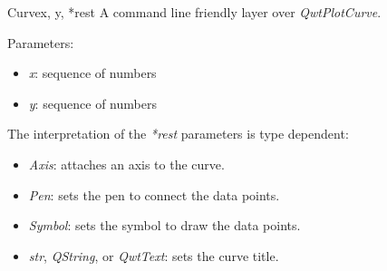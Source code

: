 \documentclass[a4paper,10pt,english]{manual}
\begin{document}
\hypertarget{PyQt4.Qwt5.qplt.Curve}{}\begin{classdesc}{Curve}{x, y, *rest}
A command line friendly layer over \emph{QwtPlotCurve}.

Parameters:
\begin{itemize}
\item {} 
\emph{x}: sequence of numbers

\item {} 
\emph{y}: sequence of numbers

\end{itemize}

The interpretation of the \emph{*rest} parameters is type dependent:
\begin{itemize}
\item {} 
\emph{Axis}: attaches an axis to the curve.

\item {} 
\emph{Pen}: sets the pen to connect the data points.

\item {} 
\emph{Symbol}: sets the symbol to draw the data points.

\item {} 
\emph{str}, \emph{QString}, or \emph{QwtText}: sets the curve title.

\end{itemize}
\end{classdesc}
\end{document}
